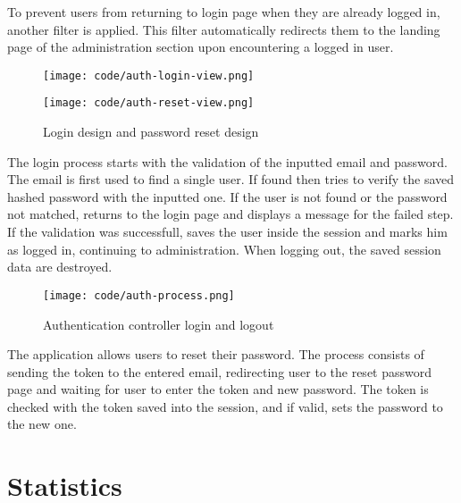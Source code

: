 \documentclass[
  digital,     %
  oneside,     %
  nosansbold,  %
  colorbold, %
  lof,         %
  lot,         %
]{fithesis4}
\begin{document}
To prevent users from returning to login page when they are already logged in, another filter is
applied. This filter automatically redirects them to the landing page of the administration section
upon encountering a logged in user.

\begin{figure}[!htbp]
	\begin{center}
		\begin{minipage}{.4\textwidth}
			\texttt{[image: code/auth-login-view.png]}
		\end{minipage}
		\begin{minipage}{.4\textwidth}
			\texttt{[image: code/auth-reset-view.png]}
		\end{minipage}
	\end{center}
	\caption{Login design and password reset design}
	\label{fig:auth-views}
\end{figure}

The login process starts with the validation of the inputted email and password. The email is first used
to find a single user. If found then tries to verify the saved hashed password with the inputted one. If
the user is not found or the password not matched, returns to the login page and displays a message
for the failed step. If the validation was successfull, saves the user inside the session and marks him as
logged in, continuing to administration. When logging out, the saved session data are destroyed.

\begin{figure}[!htbp]
	\begin{center}
		\begin{minipage}{.9\textwidth}
			\texttt{[image: code/auth-process.png]}
		\end{minipage}
	\end{center}
	\caption{Authentication controller login and logout}
	\label{fig:auth-process}
\end{figure}

The application allows users to reset their password. The process consists of sending the token to the
entered email, redirecting user to the reset password page and waiting for user to enter the token and
new password. The token is checked with the token saved into the session, and if valid, sets the
password to the new one.

\section{Statistics}
\end{document}
